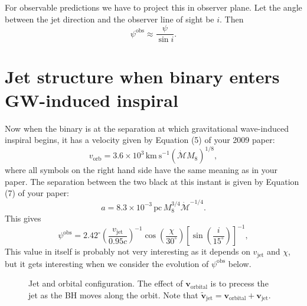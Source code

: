 \documentclass[iop]{emulateapj}
\begin{document}
For observable predictions we have to project this in observer plane.
Let the angle between the jet direction and the observer line of sight
be $i$.  Then
\begin{equation}
  \psi^\mathrm{obs}\approx\frac{\psi}{\sin i}.
\end{equation}

\section{Jet structure when binary enters GW-induced inspiral}

Now when the binary is at the separation at which gravitational
wave-induced inspiral begins, it has a velocity given by Equation (5)
of your 2009 paper:
\begin{equation}
  v_\mathrm{orb} = 3.6\times 10^3\, \mathrm{km~s}^{-1}(\dot{\mathcal{M}}M_8)^{1/8},
  \label{eqn:v}
\end{equation}
where all symbols on the right hand side have the same meaning as in
your paper.  The separation between the two black at this instant is
given by Equation (7) of your paper:
\begin{equation}
  a = 8.3\times 10^{-3}\, \mathrm{pc}\, M_8^{3/4}\dot{\mathcal{M}}^{-1/4}.
\end{equation}
This gives
\begin{equation}
  \psi^\mathrm{obs}=2.42^\circ \left(\frac{v_\mathrm{jet}}{0.95 c}\right)^{-1}\cos\left(\frac{\chi}{30^{\circ}}\right)\left[\sin\left(\frac{i}{15^{\circ}}\right)\right]^{-1},
\end{equation}
This value in itself is probably not very interesting as it depends on
$v_\mathrm{jet}$ and $\chi$, but it gets interesting when we consider
the evolution of $\psi^\mathrm{obs}$ below.

\begin{figure}
  \begin{center}
  \end{center}
  \caption{Jet and orbital configuration. The effect of
    $\mathbf{v}_\mathrm{orbital}$ is to precess the jet as the BH
    moves along the orbit. Note that
    $\tilde{\mathbf{v}}_\mathrm{jet}={\mathbf{v}}_\mathrm{orbital}+{\mathbf{v}}_\mathrm{jet}$.}
  \label{fig:BH_orbit}
\end{figure}
\end{document}
